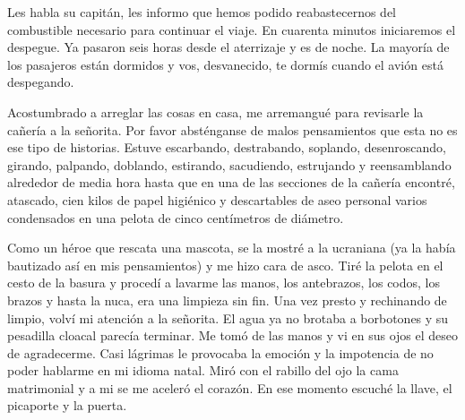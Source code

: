 \documentclass[12pt,twoside,openright,a5paper]{book}
\begin{document}
\vspace{0.5cm}

\hrulefill\hspace{0.2cm} \decofourleft\decofourright \hspace{0.2cm} \hrulefill
\vspace{0.5cm}

Les habla su capitán, les informo que hemos podido reabastecernos
del combustible necesario para continuar el viaje. En cuarenta minutos
iniciaremos el despegue. Ya pasaron seis horas desde el aterrizaje y es
de noche. La mayoría de los pasajeros están dormidos y vos, desvanecido,
te dormís cuando el avión está despegando.

\vspace{0.5cm}

\hrulefill\hspace{0.2cm} \decofourleft\decofourright \hspace{0.2cm} \hrulefill
\vspace{0.5cm}

  Acostumbrado a
arreglar las cosas en casa, me arremangué para revisarle la cañería a
la señorita. Por favor absténganse de malos pensamientos que esta no es ese
tipo de historias. Estuve escarbando, destrabando, soplando, desenroscando,
girando, palpando, doblando, estirando, sacudiendo, estrujando y reensamblando
alrededor de media hora hasta que en una de las secciones de la cañería
encontré, atascado, cien kilos de papel higiénico y descartables de aseo
personal varios condensados en una pelota de cinco centímetros de diámetro.

Como un héroe que rescata una mascota, se la mostré a la ucraniana (ya la
había bautizado así en mis pensamientos) y me hizo cara de asco. Tiré
la pelota en el cesto de la basura y procedí a lavarme las manos, los
antebrazos, los codos, los brazos y hasta la nuca, era una limpieza sin fin.
Una vez presto y rechinando de limpio, volví mi atención a la señorita. El
agua ya no brotaba a borbotones y su pesadilla cloacal parecía terminar.
Me tomó de las manos y vi en sus ojos el deseo de agradecerme. Casi
lágrimas le provocaba la emoción y la impotencia de no poder hablarme en
mi idioma natal. Miró con el rabillo del ojo la cama matrimonial y a mi
se me aceleró el corazón. En ese momento escuché la llave, el picaporte
y la puerta.

\vspace{0.5cm}

\hrulefill\hspace{0.2cm} \decofourleft\decofourright \hspace{0.2cm} \hrulefill
\vspace{0.5cm}
\end{document}
